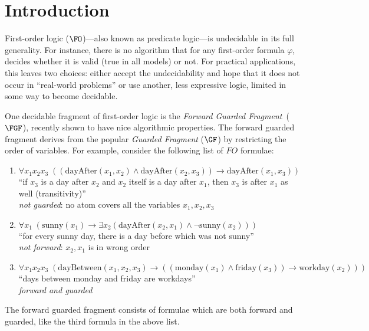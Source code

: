 \chapter{Introduction}\label{chap:introduction}

First-order logic ($\FO$)---also known as predicate logic---is undecidable in its full generality\cite[Sec. 1.1]{borger1997}.
For instance, there is no algorithm that for any first-order formula $\varphi$, decides whether it is valid (true in all models) or not.
For practical applications, this leaves two choices: either accept the undecidability and hope that it does not occur in ``real-world problems'' or use another, less expressive logic, limited in some way to become decidable.

One decidable fragment of first-order logic is the \emph{Forward Guarded Fragment}~($\FGF$), recently shown to have nice algorithmic properties\cite{Bednarczyk21}.
The forward guarded fragment derives from the popular \emph{Guarded Fragment} ($\GF$) by restricting the order of variables.
For example, consider the following list of $FO$ formulae:
\begin{enumerate}
  \item $\forall{x_{1}x_{2}x_{3}}\; ((\mathrm{dayAfter}(x_{1},x_{2}) \land \mathrm{dayAfter}(x_{2},x_{3})) \to \mathrm{dayAfter}(x_{1}, x_{3}))$ \\
        ``if $x_{3}$ is a day after $x_{2}$ and $x_{2}$ itself is a day after $x_{1}$, then $x_{3}$ is after $x_{1}$ as well (transitivity)'' \\
        \emph{not guarded}: no atom covers all the variables $x_{1}, x_{2}, x_{3}$
  \item $\forall{x_{1}}\; (\mathrm{sunny}(x_{1}) \to \exists{x_{2}} (\mathrm{dayAfter}(x_{2},x_{1}) \land \neg \mathrm{sunny}(x_{2})))$ \\
        ``for every sunny day, there is a day before which was not sunny'' \\
        \emph{not forward}: $x_{2}, x_{1}$ is in wrong order
  \item $\forall{x_{1}x_{2}x_{3}}\; (\mathrm{dayBetween}(x_{1},x_{2},x_{3}) \to ((\mathrm{monday}(x_{1}) \land \mathrm{friday}(x_{3})) \to \mathrm{workday}(x_{2})))$ \\
        ``days between monday and friday are workdays'' \\
        \emph{forward and guarded}
\end{enumerate}
The forward guarded fragment consists of formulae which are both forward and guarded, like the third formula in the above list.
